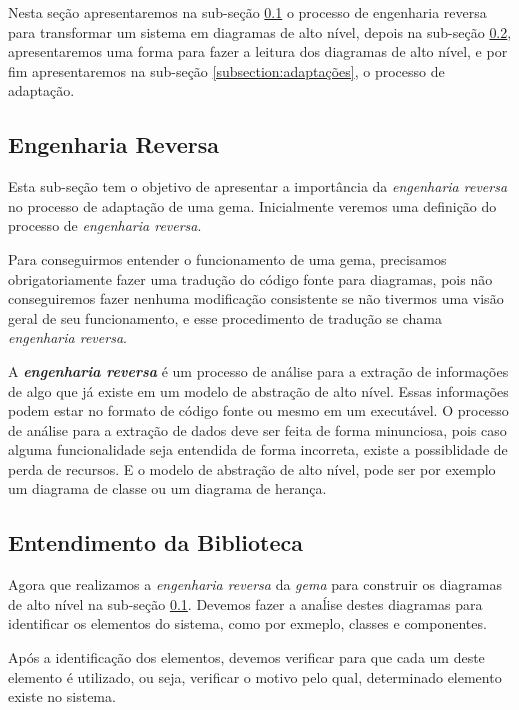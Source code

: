 Nesta seção apresentaremos na sub-seção \ref{subsection:engenharia_reversa} o processo de engenharia
reversa para transformar um sistema em diagramas de alto nível, depois na sub-seção
\ref{subsection:entendimento_da_biblioteca}, apresentaremos uma forma para fazer a leitura dos
diagramas de alto nível, e por fim apresentaremos na sub-seção \ref{subsection:adaptações}, o processo
de adaptação.


\subsection{Engenharia Reversa}
\label{subsection:engenharia_reversa}


Esta sub-seção tem o objetivo de apresentar a importância da \emph{engenharia reversa} no processo de adaptação
de uma gema. Inicialmente veremos uma definição do processo de \emph{engenharia reversa}.

Para conseguirmos entender o funcionamento de uma gema, precisamos obrigatoriamente fazer uma tradução
do código fonte para diagramas, pois não conseguiremos fazer nenhuma modificação consistente
se não tivermos uma visão geral de seu funcionamento, e esse procedimento de tradução se chama 
\emph{engenharia reversa}.

A \textbf{\emph{engenharia reversa}} é um processo de análise para a extração de informações de algo que já 
existe em um modelo de abstração de alto nível. Essas informações podem estar no formato de código 
fonte ou mesmo em um executável. O processo de análise para a extração de dados deve ser feita de forma
minunciosa, pois caso alguma funcionalidade seja entendida de forma incorreta, existe a possiblidade de
perda de recursos. E o modelo de abstração de alto nível, pode ser por exemplo um diagrama de classe
ou um diagrama de herança.
 
 
\subsection{Entendimento da Biblioteca} 
\label{subsection:entendimento_da_biblioteca}


Agora que realizamos a \emph{engenharia reversa} da \emph{gema} para construir os diagramas
de alto nível na sub-seção \ref{subsection:engenharia_reversa}. Devemos fazer a anaĺise destes
diagramas para identificar os elementos do sistema, como por exmeplo, classes e componentes.

Após a identificação dos elementos, devemos verificar para que cada um deste elemento é utilizado, ou seja,
verificar o motivo pelo qual, determinado elemento existe no sistema.

